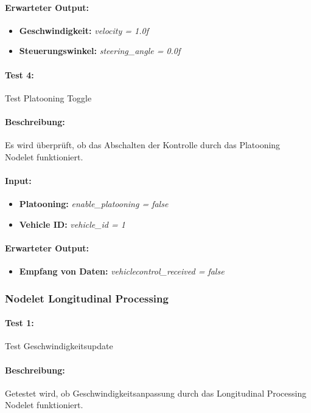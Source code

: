 \documentclass[a4paper, 12pt, titlepage]{scrartcl}
\begin{document}
				\paragraph{Erwarteter Output:}
				\begin{itemize} \itemsep-0.5em
					\item \textbf{Geschwindigkeit:} \emph{velocity = 1.0f}
					\item \textbf{Steuerungswinkel:} \emph{steering\_angle = 0.0f}
				\end{itemize} 				

				\paragraph{Test 4:} {Test Platooning Toggle}
				\paragraph{Beschreibung:} Es wird überprüft, ob das Abschalten der Kontrolle durch das Platooning Nodelet funktioniert.
				\paragraph{Input:}
				\begin{itemize} \itemsep-0.5em
					\item \textbf{Platooning:} \emph{enable\_platooning = false}
					\item \textbf{Vehicle ID:} \emph{vehicle\_id = 1}	
				\end{itemize}
				\paragraph{Erwarteter Output:}  
				\begin{itemize} \itemsep-0.5em
					\item \textbf{Empfang von Daten:} \emph{vehiclecontrol\_received = false}
				\end{itemize}
				
			\subsubsection{Nodelet Longitudinal Processing}
			\label{node_longitudinal_processing}
			\paragraph{Test 1:}{Test Geschwindigkeitsupdate}
			\paragraph{Beschreibung:} Getestet wird, ob Geschwindigkeitsanpassung durch das Longitudinal Processing Nodelet funktioniert.
\end{document}

